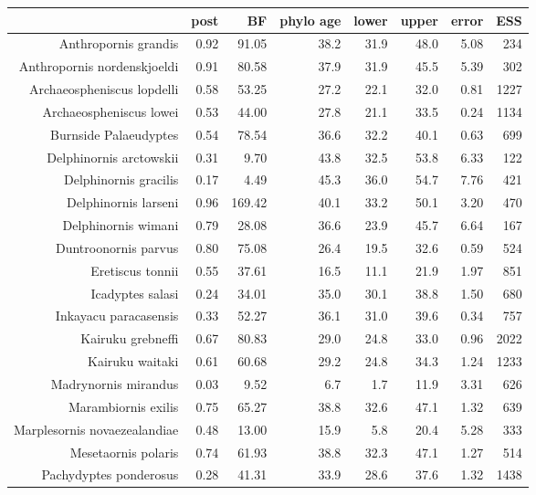 \begin{table}[ht]
\centering
\begin{tabular}{rrrrrrrr}
  \hline
 & post & BF & phylo age & lower & upper & error & ESS \\ 
  \hline
Anthropornis grandis & 0.92 & 91.05 & 38.2 & 31.9 & 48.0 & 5.08 & 234 \\ 
  Anthropornis nordenskjoeldi & 0.91 & 80.58 & 37.9 & 31.9 & 45.5 & 5.39 & 302 \\ 
  Archaeospheniscus lopdelli & 0.58 & 53.25 & 27.2 & 22.1 & 32.0 & 0.81 & 1227 \\ 
  Archaeospheniscus lowei & 0.53 & 44.00 & 27.8 & 21.1 & 33.5 & 0.24 & 1134 \\ 
  Burnside Palaeudyptes & 0.54 & 78.54 & 36.6 & 32.2 & 40.1 & 0.63 & 699 \\ 
  Delphinornis arctowskii & 0.31 & 9.70 & 43.8 & 32.5 & 53.8 & 6.33 & 122 \\ 
  Delphinornis gracilis & 0.17 & 4.49 & 45.3 & 36.0 & 54.7 & 7.76 & 421 \\ 
  Delphinornis larseni & 0.96 & 169.42 & 40.1 & 33.2 & 50.1 & 3.20 & 470 \\ 
  Delphinornis wimani & 0.79 & 28.08 & 36.6 & 23.9 & 45.7 & 6.64 & 167 \\ 
  Duntroonornis parvus & 0.80 & 75.08 & 26.4 & 19.5 & 32.6 & 0.59 & 524 \\ 
  Eretiscus tonnii & 0.55 & 37.61 & 16.5 & 11.1 & 21.9 & 1.97 & 851 \\ 
  Icadyptes salasi & 0.24 & 34.01 & 35.0 & 30.1 & 38.8 & 1.50 & 680 \\ 
  Inkayacu paracasensis & 0.33 & 52.27 & 36.1 & 31.0 & 39.6 & 0.34 & 757 \\ 
  Kairuku grebneffi & 0.67 & 80.83 & 29.0 & 24.8 & 33.0 & 0.96 & 2022 \\ 
  Kairuku waitaki & 0.61 & 60.68 & 29.2 & 24.8 & 34.3 & 1.24 & 1233 \\ 
  Madrynornis mirandus & 0.03 & 9.52 & 6.7 & 1.7 & 11.9 & 3.31 & 626 \\ 
  Marambiornis exilis & 0.75 & 65.27 & 38.8 & 32.6 & 47.1 & 1.32 & 639 \\ 
  Marplesornis novaezealandiae & 0.48 & 13.00 & 15.9 & 5.8 & 20.4 & 5.28 & 333 \\ 
  Mesetaornis polaris & 0.74 & 61.93 & 38.8 & 32.3 & 47.1 & 1.27 & 514 \\ 
  Pachydyptes ponderosus & 0.28 & 41.31 & 33.9 & 28.6 & 37.6 & 1.32 & 1438 \\ 

\end{tabular}
\end{table}
